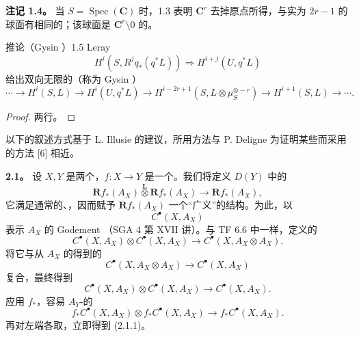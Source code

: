 \textbf{注记 1.4。} 当 $S=\operatorname{Spec}(\mathbf C)$ 时，1.3 表明 $\mathbf C^r$ 去掉原点所得，与实为 $2r-1$ 的球面有相同的；该球面是 $\mathbf C^r\setminus0$ 的。

\begin{SGAresult}{推论（Gysin ）}{1.5}
Leray 
\[
 H^i(S,R^jq_*(q^*L))\Longrightarrow H^{i+j}(U,q^*L)
\]
给出双向无限的（称为 Gysin ）
\[
 \cdots\longrightarrow H^i(S,L)\longrightarrow H^i(U,q^*L)
 \longrightarrow H^{i-2r+1}(S,L\otimes\mu_S^{\otimes-r})
 \longrightarrow H^{i+1}(S,L)\longrightarrow\cdots.
\]
\end{SGAresult}
\begin{proof}两行。\end{proof}

以下的叙述方式基于 L. Illusie 的建议，所用方法与 P. Deligne 为证明某些而采用的方法 [6] 相近。

\textbf{2.1。} 设 $X,Y$ 是两个，$f:X\to Y$ 是一个。我们将定义 $D(Y)$ 中的
\[
 \mathbf Rf_*(A_X)\mathbin{\overset{\mathbf L}{\otimes}}\mathbf Rf_*(A_X)
 \longrightarrow\mathbf Rf_*(A_X),\tag{2.1.1}
\]
它满足通常的、，因而赋予 $\mathbf Rf_*(A_X)$ 一个“广义”的结构。为此，以
\[
 C^\bullet(X,A_X)
\]
表示 $A_X$ 的 Godement （SGA 4 第 XVII 讲）。与 TF 6.6 中一样，定义的
\[
 C^\bullet(X,A_X)\otimes C^\bullet(X,A_X)\longrightarrow C^\bullet(X,A_X\otimes A_X).
\]
将它与从 $A_X$ 的得到的
\[
 C^\bullet(X,A_X\otimes A_X)\longrightarrow C^\bullet(X,A_X)
\]
复合，最终得到
\[
 C^\bullet(X,A_X)\otimes C^\bullet(X,A_X)\longrightarrow C^\bullet(X,A_X).\tag{2.1.2}
\]
应用 $f_*$，容易 $A_Y$-的
\[
 f_*C^\bullet(X,A_X)\otimes f_*C^\bullet(X,A_X)\longrightarrow f_*C^\bullet(X,A_X).
\]
再对左端各取，立即得到 (2.1.1)。

